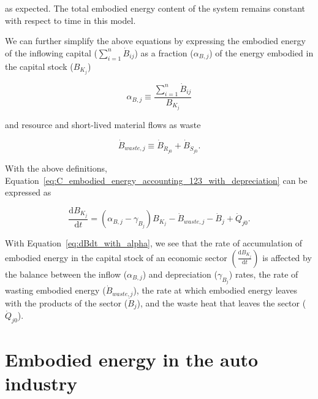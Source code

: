 \noindent{}as expected. The total embodied energy content of the system 
remains constant with respect to time in this model.

We can further simplify the above equations by expressing
the embodied energy of the inflowing capital ($\sum_{i=1}^{n} \dot{B}_{ij}$)
as a fraction ($\alpha_{B,j}$) of the energy embodied in the capital stock ($B_{K_{j}}$)

\begin{equation}
	\alpha_{B,j}
	\equiv \frac{\sum\limits_{i=1}^n\dot{B}_{ij}}{B_{K_{j}}}
\end{equation}

\noindent{}and resource and short-lived material flows as waste

\begin{equation}
	\dot{B}_{waste,j}
	\equiv \dot{B}_{\dot{R}_{j0}}
	+ \dot{B}_{\dot{S}_{j0}}.
\end{equation}

\noindent{}With the above definitions, 
Equation~\ref{eq:C_embodied_energy_accounting_123_with_depreciation}
can be expressed as

\begin{equation} \label{eq:dBdt_with_alpha}
	\frac{\mathrm{d}B_{K_{j}}}{\mathrm{d}t} 
	= (\alpha_{B,j} - \gamma_{B_{j}}) B_{K_{j}}
	- \dot{B}_{waste,j} 
	- \dot{B}_{j}
	+ \dot{Q}_{j0}.
\end{equation}

With Equation~\ref{eq:dBdt_with_alpha}, we see that
the rate of accumulation of embodied energy in the capital stock of an economic sector
$\left( \frac{\mathrm{d}B_{K_{j}}}{\mathrm{d}t} \right)$
is affected by the balance between the inflow ($\alpha_{B,j}$) 
and depreciation ($\gamma_{B_{j}}$) rates, the rate of wasting
embodied energy ($\dot{B}_{waste,j}$), 
the rate at which embodied energy leaves with the products 
of the sector ($\dot{B}_{j}$), 
and the waste heat that leaves the sector ($\dot{Q}_{j0}$).


\section{Embodied energy in the auto industry}
\label{sec:embodied_energy_auto}


